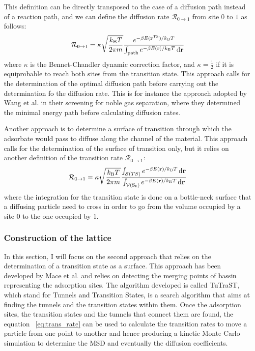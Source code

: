 \documentclass[main]{subfiles}
\begin{document}
This definition can be directly transposed to the case of a diffusion path instead of a reaction path, and we can define the diffusion rate $\mathcal{R}_{0\rightarrow 1}$ from site $0$ to $1$ as follows:
\begin{equation}\label{eq:trans_rate_path}
  \mathcal{R}_{0\rightarrow 1} = \kappa\sqrt{\frac{k_{\text{B}}T}{2\pi m}}\frac{e^{-\beta E(\mathbf{r}^{\text{TS}})/k_{\text{B}}T}}{\int_{\text{path}}e^{-\beta E(\mathbf{r})/k_{\text{B}}T}\mathop{}\mathopen{}\mathrm{d}\mathbf{r}}
\end{equation}
where $\kappa$ is the Bennet-Chandler dynamic correction factor,\autocite{BENNETT1977} and  $\kappa=\tfrac{1}{2}$ if it is equiprobable to reach both sites from the transition state. This approach calls for the determination of the optimal diffusion path before carrying out the determination fo the diffusion rate. This is for instance the approach adopted by Wang et al. in their screening for noble gas separation, where they determined the minimal energy path before calculating diffusion rates.\autocite{Wang_2022}

Another approach is to determine a surface of transition through which the adsorbate would pass to diffuse along the channel of the material. This approach calls for the determination of the surface of transition only, but it relies on another definition of the transition rate $\mathcal{R}_{0\rightarrow 1}$:
\begin{equation}\label{eq:trans_rate}
  \mathcal{R}_{0\rightarrow 1} = \kappa\sqrt{\frac{k_{\text{B}}T}{2\pi m}}\frac{\int_{\mathcal{S}(TS)}e^{-\beta E(\mathbf{r})/k_{\text{B}}T}\mathop{}\mathopen{}\mathrm{d}\mathbf{r}}{\int_{\mathcal{V}(\text{S}_0)}e^{-\beta E(\mathbf{r})/k_{\text{B}}T}\mathop{}\mathopen{}\mathrm{d}\mathbf{r}}
\end{equation}
where the integration for the transition state is done on a bottle-neck surface that a diffusing particle need to cross in order to go from the volume occupied by a site $0$ to the one occupied by $1$.

\subsubsection{Construction of the lattice}

In this section, I will focus on the second approach that relies on the determination of a transition state as a surface. This approach has been developed by Mace et al. and relies on detecting the merging points of bassin representing the adsorption sites. The algorithm developed is called TuTraST, which stand for Tunnels and Transition States, is a search algorithm that aims at finding the tunnels and the transition states within them.\autocite{Mace_2019} Once the adsorption sites, the transition states and the tunnels that connect them are found, the equation ~\ref{eq:trans_rate} can be used to calculate the transition rates to move a particle from one point to another and hence producing a kinetic Monte Carlo simulation to determine the MSD and eventually the diffusion coefficients. 
\end{document}
